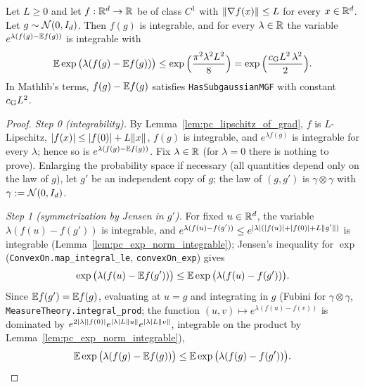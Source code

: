 \begin{lemma}\label{lem:maurey_pisier}
\leanok
{}
Let $L \ge 0$ and let $f : \mathbb{R}^d \to \mathbb{R}$ be of class $C^1$ with $\lVert \nabla f(x) \rVert \le L$ for
every $x \in \mathbb{R}^d$. Let $g \sim \mathcal{N}(0, I_d)$. Then $f(g)$ is integrable, and for every
$\lambda \in \mathbb{R}$ the variable $e^{\lambda(f(g) - \mathbb{E} f(g))}$ is integrable with
\[
  \mathbb{E}\exp\big(\lambda(f(g) - \mathbb{E} f(g))\big) \le \exp\Big(\frac{\pi^2\lambda^2L^2}{8}\Big)
  = \exp\Big(\frac{c_{\mathrm{G}} L^2\,\lambda^2}{2}\Big).
\]
In Mathlib's terms, $f(g) - \mathbb{E} f(g)$ satisfies \texttt{HasSubgaussianMGF} with constant
$c_{\mathrm{G}} L^2$.
\end{lemma}

\begin{proof}
\leanok
{}
\emph{Step 0 (integrability).} By Lemma~\ref{lem:pc_lipschitz_of_grad}, $f$ is $L$-Lipschitz,
$\lvert f(x) \rvert \le \lvert f(0) \rvert + L\lVert x \rVert$, $f(g)$ is integrable, and $e^{\lambda f(g)}$ is
integrable for every $\lambda$; hence so is $e^{\lambda(f(g)-\mathbb{E} f(g))}$. Fix $\lambda \in \mathbb{R}$
(for $\lambda = 0$ there is nothing to prove). Enlarging the probability space if necessary
(all quantities depend only on the law of $g$), let $g'$ be an independent copy of $g$; the
law of $(g,g')$ is $\gamma\otimes\gamma$ with $\gamma := \mathcal{N}(0,I_d)$.

\emph{Step 1 (symmetrization by Jensen in $g'$).} For fixed $u \in \mathbb{R}^d$, the variable
$\lambda(f(u) - f(g'))$ is integrable, and $e^{\lambda(f(u)-f(g'))} \le
e^{\lvert \lambda \rvert(\lvert f(u) \rvert + \lvert f(0) \rvert + L\lVert g' \rVert)}$ is integrable
(Lemma~\ref{lem:pc_exp_norm_integrable}); Jensen's inequality for $\exp$
(\texttt{ConvexOn.map\_integral\_le}, \texttt{convexOn\_exp}) gives
\[
  \exp\big(\lambda(f(u) - \mathbb{E} f(g'))\big) \le \mathbb{E}\exp\big(\lambda(f(u) - f(g'))\big).
\]
Since $\mathbb{E} f(g') = \mathbb{E} f(g)$, evaluating at $u = g$ and integrating in $g$ (Fubini for
$\gamma\otimes\gamma$, \texttt{MeasureTheory.integral\_prod}; the function
$(u,v) \mapsto e^{\lambda(f(u)-f(v))}$ is dominated by
$e^{2\lvert \lambda \rvert\lvert f(0) \rvert}e^{\lvert \lambda \rvert L\lVert u \rVert}e^{\lvert \lambda \rvert L\lVert v \rVert}$, integrable on the
product by Lemma~\ref{lem:pc_exp_norm_integrable}),
\[
  \mathbb{E}\exp\big(\lambda(f(g) - \mathbb{E} f(g))\big) \le \mathbb{E}\exp\big(\lambda(f(g) - f(g'))\big).
\]


\end{proof}
